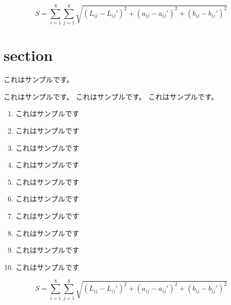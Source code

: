 \documentclass{jsarticle}
\begin{document}
\begin{equation}
    \label{sLab2}
    S=\sum_{i=1}^{8} \sum_{j=1}^{8}
    \sqrt{(L_{ij} - L_{ij}')^2 + (a_{ij} - a_{ij}')^2 + (b_{ij} - b_{ij}')^2}
\end{equation}

\section{section}
これはサンプルです。


これはサンプルです。
これはサンプルです。
これはサンプルです。

\begin{enumerate}
    \item これはサンプルです
    \item これはサンプルです
    \item これはサンプルです
    \item これはサンプルです
    \item これはサンプルです
    \item これはサンプルです
    \item これはサンプルです
    \item これはサンプルです
    \item これはサンプルです
    \item これはサンプルです
\end{enumerate}

\begin{equation}
    \label{sLab3}
    S=\sum_{i=1}^{8} \sum_{j=1}^{8}
    \sqrt{(L_{ij} - L_{ij}')^2 + (a_{ij} - a_{ij}')^2 + (b_{ij} - b_{ij}')^2}
\end{equation}
\end{document}
